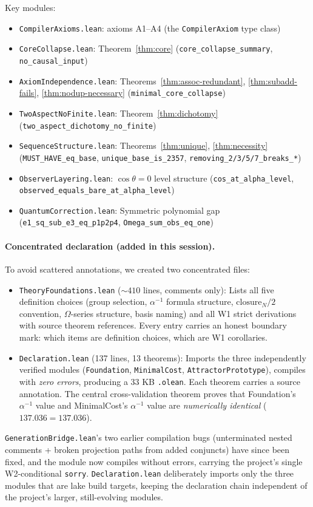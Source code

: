 ﻿\documentclass[11pt]{article}
\begin{document}
Key modules:
{\sloppy
\begin{itemize}
\item \texttt{CompilerAxioms.lean}:
  axioms A1--A4 (the \texttt{CompilerAxiom} type class)
\item \texttt{CoreCollapse.lean}:
  Theorem~\ref{thm:core} (\texttt{core\_collapse\_summary},
  \texttt{no\_causal\_input})
\item \texttt{AxiomIndependence.lean}:
  Theorems~\ref{thm:assoc-redundant},
  \ref{thm:subadd-fails}, \ref{thm:nodup-necessary}
  (\texttt{minimal\_core\_collapse})
\item \texttt{TwoAspectNoFinite.lean}:
  Theorem~\ref{thm:dichotomy}
  (\texttt{two\_aspect\_dichotomy\_no\_finite})
\item \texttt{SequenceStructure.lean}:
  Theorems~\ref{thm:unique}, \ref{thm:necessity}
  (\texttt{MUST\_HAVE\_eq\_base},
  \texttt{unique\_base\_is\_2357},
  \texttt{removing\_2/3/5/7\_breaks\_*})
\item \texttt{ObserverLayering.lean}:
  $\cos\theta = 0$ level structure
  (\texttt{cos\_at\_alpha\_level},
  \texttt{observed\_equals\_bare\_at\_alpha\_level})
\item \texttt{QuantumCorrection.lean}:
  Symmetric polynomial gap
  (\texttt{e1\_sq\_sub\_e3\_eq\_p1p2p4},
  \texttt{Omega\_sum\_obs\_eq\_one})
\end{itemize}

\paragraph{Concentrated declaration (added in this session).}
To avoid scattered annotations, we created two concentrated files:
\begin{itemize}
\item \texttt{TheoryFoundations.lean} ($\sim 410$ lines, comments only):
  Lists all five definition choices (group selection,
  $\alpha^{-1}$ formula structure, $\mathrm{closure}_N/2$
  convention, $\Omega$-series structure, basis naming) and
  all W1 strict derivations with source theorem references.
  Every entry carries an honest boundary mark: which items
  are definition choices, which are W1 corollaries.
\item \texttt{Declaration.lean} (137 lines, 13 theorems):
  Imports the three independently verified modules
  (\texttt{Foundation}, \texttt{MinimalCost},
  \texttt{AttractorPrototype}), compiles with \emph{zero
  errors}, producing a 33 KB \texttt{.olean}. Each theorem
  carries a source annotation. The central cross-validation
  theorem proves that Foundation's $\alpha^{-1}$ value and
  MinimalCost's $\alpha^{-1}$ value are \emph{numerically
  identical} ($137.036 = 137.036$).
\end{itemize}
\par}
\texttt{GenerationBridge.lean}'s two earlier compilation bugs
(unterminated nested comments + broken projection paths
from added conjuncts) have since been fixed, and the module
now compiles without errors, carrying the project's single
W2-conditional \texttt{sorry}. \texttt{Declaration.lean}
deliberately imports only the three modules that are lake
build targets, keeping the declaration chain independent of
the project's larger, still-evolving modules.
\end{document}

